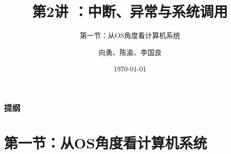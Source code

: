 


\title[第2讲]{第2讲 ：中断、异常与系统调用 } %
\subtitle{第一节：从OS角度看计算机系统}
\author{向勇、陈渝、李国良} %
\date{\today} %



\begin{frame}
\titlepage %
\end{frame}

\begin{frame}
\frametitle{提纲} %
\tableofcontents %
\end{frame}


\section{第一节：从OS角度看计算机系统 } %

